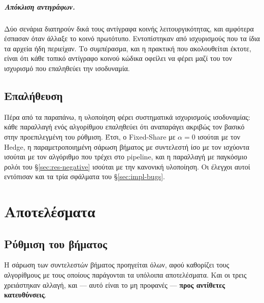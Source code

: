 \documentclass[12pt,a4paper,oneside]{report}
\renewcommand{\_}{\oldunderscore\allowbreak}
\theoremstyle{definition}
\theoremstyle{plain}
\theoremstyle{remark}
\begin{document}
\paragraph{Απόκλιση αντιγράφων.} Δύο σενάρια διατηρούν δικά τους αντίγραφα κοινής
λειτουργικότητας, και αμφότερα έσπασαν όταν άλλαξε το κοινό πρωτότυπο. Εντοπίστηκαν από
ισχυρισμούς που τα ίδια τα αρχεία ήδη περιείχαν. Το συμπέρασμα, και η πρακτική που
ακολουθείται έκτοτε, είναι ότι κάθε τοπικό αντίγραφο κοινού κώδικα οφείλει να φέρει μαζί του
τον ισχυρισμό που επαληθεύει την ισοδυναμία.

\section{Επαλήθευση}

Πέρα από τα παραπάνω, η υλοποίηση φέρει συστηματικά ισχυρισμούς ισοδυναμίας: κάθε παραλλαγή
ενός αλγορίθμου επαληθεύει ότι αναπαράγει ακριβώς τον βασικό στην προεπιλεγμένη του ρύθμιση.
Έτσι, ο Fixed-Share με $\alpha=0$ ισούται με τον Hedge, η παραμετροποιημένη σάρωση βήματος
με συντελεστή ίσο με τον ισχύοντα ισούται με τον αλγόριθμο που τρέχει στο pipeline, και η
παραλλαγή με παγκόσμιο ρολόι του \S\ref{sec:res-negative} ισούται με την κανονική υλοποίηση.
Οι έλεγχοι αυτοί εντόπισαν και τα τρία σφάλματα του \S\ref{sec:impl-bugs}.

\chapter{Αποτελέσματα}
\label{ch:results}

\section{Ρύθμιση του βήματος}
\label{sec:res-steps}

Η σάρωση των συντελεστών βήματος προηγείται όλων, αφού καθορίζει τους αλγορίθμους με τους
οποίους παράγονται τα υπόλοιπα αποτελέσματα. Και οι τρεις χρειάστηκαν αλλαγή, και --- αυτό
είναι το μη προφανές --- \textbf{προς αντίθετες κατευθύνσεις}.
\end{document}
